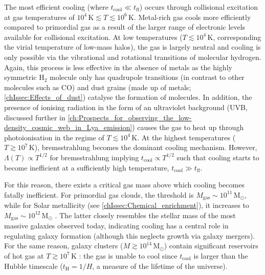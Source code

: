 The most efficient cooling (where $t_\text{cool} \ll t_\text{ff}$) occurs through collisional excitation at gas temperatures of $10^4 \, \mathrm{K} \lesssim T \lesssim 10^6 \, \mathrm{K}$. Metal-rich gas cools more efficiently compared to primordial gas as a result of the larger range of electronic levels available for collisional excitation. At low temperatures ($T \lesssim 10^4 \, \mathrm{K}$, corresponding the virial temperature of low-mass halos), the gas is largely neutral and cooling is only possible via the vibrational and rotational transitions of molecular hydrogen. Again, this process is less effective in the absence of metals as the highly symmetric $\mathrm{H_2}$ molecule only has quadrupole transitions (in contrast to other molecules such as $\mathrm{CO}$) and dust grains (made up of metals; \cref{chIssec:Effects_of_dust}) catalyse the formation of molecules. In addition, the presence of ionising radiation in the form of an ultraviolet background (UVB, discussed further in \cref{ch:Prospects_for_observing_the_low-density_cosmic_web_in_Lya_emission}) causes the gas to heat up through photoionisation in the regime of $T \lesssim 10^4 \, \mathrm{K}$. At the highest temperatures ($T \gtrsim 10^7 \, \mathrm{K}$), bremsstrahlung becomes the dominant cooling mechanism. However, $\Lambda(T) \propto T^{1/2}$ for bremsstrahlung \citep{1979rpa..book.....R} implying $t_\text{cool} \propto T^{1/2}$ such that cooling starts to become inefficient at a sufficiently high temperature, $t_\text{cool} \gg t_\text{ff}$.

For this reason, there exists a critical gas mass above which cooling becomes fatally inefficient. For primordial gas clouds, the threshold is $M_\text{gas} \sim 10^{11} \, \mathrm{M_\odot}$, while for Solar metallicity (see \cref{chIssec:Chemical_enrichment}), it increases to $M_\text{gas} \sim 10^{12} \, \mathrm{M_\odot}$ \citep[e.g.][]{1977MNRAS.179..541R, 1978MNRAS.183..341W}. The latter closely resembles the stellar mass of the most massive galaxies observed today, indicating cooling has a central role in regulating galaxy formation (although this neglects growth via galaxy mergers). For the same reason, galaxy clusters ($M \gtrsim 10^{14} \, \mathrm{M_\odot}$) contain significant reservoirs of hot gas at $T \gtrsim 10^{7} \, \mathrm{K}$ \citep[which can be observed in X-ray emission; e.g.][]{2001ApJ...546...63T}: the gas is unable to cool since $t_\text{cool}$ is larger than the Hubble timescale ($t_\text{H} = 1/H$, a measure of the lifetime of the universe).

